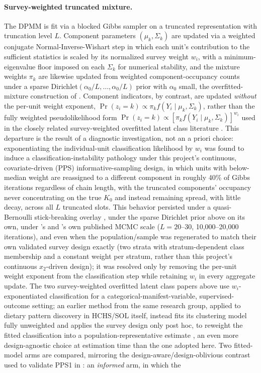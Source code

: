 \documentclass[11pt]{article}
\begin{document}
\paragraph{Survey-weighted truncated mixture.} The DPMM is fit via a blocked Gibbs sampler on a truncated representation with truncation level $L$. Component parameters $(\mu_k, \Sigma_k)$ are updated via a weighted conjugate Normal-Inverse-Wishart step in which each unit's contribution to the sufficient statistics is scaled by its normalized survey weight $w_i$, with a minimum-eigenvalue floor imposed on each $\Sigma_k$ for numerical stability, and the mixture weights $\pi_k$ are likewise updated from weighted component-occupancy counts under a sparse Dirichlet$(\alpha_0/L,\dots,\alpha_0/L)$ prior with $\alpha_0$ small, the overfitted-mixture construction of \citet{rousseau2011asymptotic}. Component indicators, by contrast, are updated \emph{without} the per-unit weight exponent, $\Pr(z_i = k) \propto \pi_k f(Y_i \mid \mu_k, \Sigma_k)$, rather than the fully weighted pseudolikelihood form $\Pr(z_i = k) \propto [\pi_k f(Y_i \mid \mu_k, \Sigma_k)]^{w_i}$ used in the closely related survey-weighted overfitted latent class literature \citep{stephenson2024wolca,wu2024swolca}. This departure is the result of a diagnostic investigation, not an a priori choice: exponentiating the individual-unit classification likelihood by $w_i$ was found to induce a classification-instability pathology under this project's continuous, covariate-driven (PPS) informative-sampling design, in which units with below-median weight are reassigned to a different component in roughly 40\% of Gibbs iterations regardless of chain length, with the truncated components' occupancy never concentrating on the true $K_0$ and instead remaining spread, with little decay, across all $L$ truncated slots. This behavior persisted under a quasi-Bernoulli stick-breaking overlay \citep{zeng2020consistent}, under the sparse Dirichlet prior above on its own, under \citeauthor{stephenson2024wolca}'s and \citeauthor{wu2024swolca}'s own published MCMC scale ($L=20$--$30$, 10,000--20,000 iterations), and even when the population/sample was regenerated to match their own validated survey design exactly (two strata with stratum-dependent class membership and a constant weight per stratum, rather than this project's continuous $x_2$-driven design); it was resolved only by removing the per-unit weight exponent from the classification step while retaining $w_i$ in every aggregate update. The two survey-weighted overfitted latent class papers above use $w_i$-exponentiated classification for a categorical-manifest-variable, supervised-outcome setting; an earlier method from the same research group, applied to dietary pattern discovery in HCHS/SOL itself, instead fits its clustering model fully unweighted and applies the survey design only post hoc, to reweight the fitted classification into a population-representative estimate \citep{stephenson2020rpchchssol}, an even more design-agnostic choice at estimation time than the one adopted here. Two fitted-model arms are compared, mirroring the design-aware/design-oblivious contrast used to validate PPS1 in \citet{williamssavitsky2021uncertainty}: an \emph{informed} arm, in which the 
\end{document}
